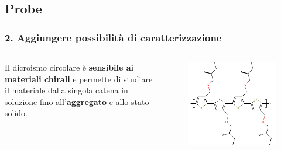 \documentclass{beamer}
\begin{document}
\subsection{Probe}
\logo{}
\begin{frame}%
\frametitle{2. Aggiungere possibilità di caratterizzazione}
\begin{columns}
Il dicroismo circolare è \textbf{sensibile ai materiali chirali} e permette di studiare il materiale dalla singola catena in soluzione fino all'\textbf{aggregato} e allo stato solido.

\bigskip
\bigskip

\bigskip
\bigskip


\begin{figure}\centering \includegraphics[width=1\textwidth]{img/polimero-quattro.pdf}\end{figure}
\end{columns}
\end{frame}
\end{document}
